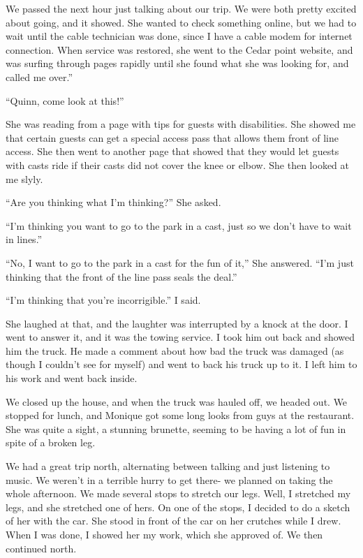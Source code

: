 We passed the next hour just talking about our trip. We were both pretty excited about
going, and it showed. She wanted to check something online, but we had to wait until the cable
technician was done, since I have a cable modem for internet connection. When service was
restored, she went to the Cedar point website, and was surfing through pages rapidly until she
found what she was looking for, and called me over.''

``Quinn, come look at this!''

She was reading from a page with tips for guests with disabilities. She showed me that
certain guests can get a special access pass that allows them front of line access. She then
went to another page that showed that they would let guests with casts ride if their casts did
not cover the knee or elbow. She then looked at me slyly.

``Are you thinking what I'm thinking?'' She asked.

``I'm thinking you want to go to the park in a cast, just so we don't have to wait in
lines.''

``No, I want to go to the park in a cast for the fun of it,'' She answered. ``I'm just
thinking that the front of the line pass seals the deal.''

``I'm thinking that you're incorrigible.'' I said.

She laughed at that, and the laughter was interrupted by a knock at the door. I went to
answer it, and it was the towing service. I took him out back and showed him the truck. He made
a comment about how bad the truck was damaged (as though I couldn't see for myself) and went to
back his truck up to it. I left him to his work and went back inside.

We closed up the house, and when the truck was hauled off, we headed out. We stopped for
lunch, and Monique got some long looks from guys at the restaurant. She was quite a sight, a
stunning brunette, seeming to be having a lot of fun in spite of a broken leg.

We had a great trip north, alternating between talking and just listening to music. We
weren't in a terrible hurry to get there- we planned on taking the whole afternoon. We made
several stops to stretch our legs. Well, I stretched my legs, and she stretched one of hers. On
one of the stops, I decided to do a sketch of her with the car. She stood in front of the car on
her crutches while I drew. When I was done, I showed her my work, which she approved of. We then
continued north.

